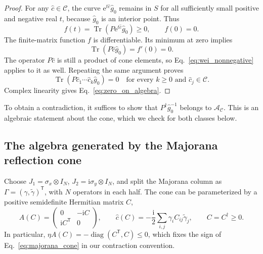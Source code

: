 \documentclass[11pt,a4paper]{article}
\newcommand{\Tr}{\operatorname{Tr}}
\newcommand{\diag}{\operatorname{diag}}
\newcommand{\ee}{\mathrm e}
\newcommand{\ii}{\mathrm i}
\newcommand{\trans}{\mathsf T}
\newcommand{\mc}[1]{\mathcal{#1}}
\theoremstyle{remark}
\numberwithin{equation}{section}
\begin{document}
\begin{proof}
For any \(\hat c\in\mc C\), the curve
\(\ee^{t\hat c}\hat g_0\) remains in \(S\) for all sufficiently small
positive and negative real \(t\), because \(\hat g_0\) is an interior
point. Thus
\begin{equation}
f(t)=\Tr(P\ee^{t\hat c}\hat g_0)\geq0,\qquad f(0)=0.
\label{eq:minimum}
\end{equation}
The finite-matrix function \(f\) is differentiable. Its minimum at zero
implies
\begin{equation}
\Tr(P\hat c\hat g_0)=f'(0)=0.
\label{eq:zero_first_derivative}
\end{equation}
The operator \(P\hat c\) is still a product of cone elements, so
Eq.~\eqref{eq:wei_nonnegative} applies to it as well. Repeating the same
argument proves
\begin{equation}
\Tr(P\hat c_1\cdots\hat c_k\hat g_0)=0
\quad\text{for every }k\geq0\text{ and }\hat c_j\in\mc C.
\label{eq:all_words_zero}
\end{equation}
Complex linearity gives Eq.~\eqref{eq:zero_on_algebra}.
\end{proof}

To obtain a contradiction, it suffices to show that
\(P^\dagger\hat g_0^{-1}\) belongs to \(\mc A_{\mc C}\). This is an
algebraic statement about the cone, which we check for both classes below.

\subsection{The algebra generated by the Majorana reflection cone}

Choose
\(J_1=\sigma_x\otimes I_N\),
\(J_2=\ii\sigma_y\otimes I_N\), and split the Majorana column as
\(\Gamma=(\gamma,\widetilde\gamma)^\trans\), with \(N\) operators in
each half. The cone can be parameterized by a positive semidefinite Hermitian
matrix \(C\),
\begin{equation}
A(C)=\begin{pmatrix}0&-\ii C\\ \ii C^\trans&0\end{pmatrix},
\qquad
\hat c(C)=-\frac{\ii}{2}
\sum_{i,j}\gamma_iC_{ij}\widetilde\gamma_j,
\qquad C=C^\dagger\geq0.
\label{eq:majorana_cone}
\end{equation}
In particular,
\(\eta A(C)=-\diag(C^\trans,C)\leq0\), which fixes the sign of
Eq.~\eqref{eq:majorana_cone} in our contraction convention.
\end{document}
